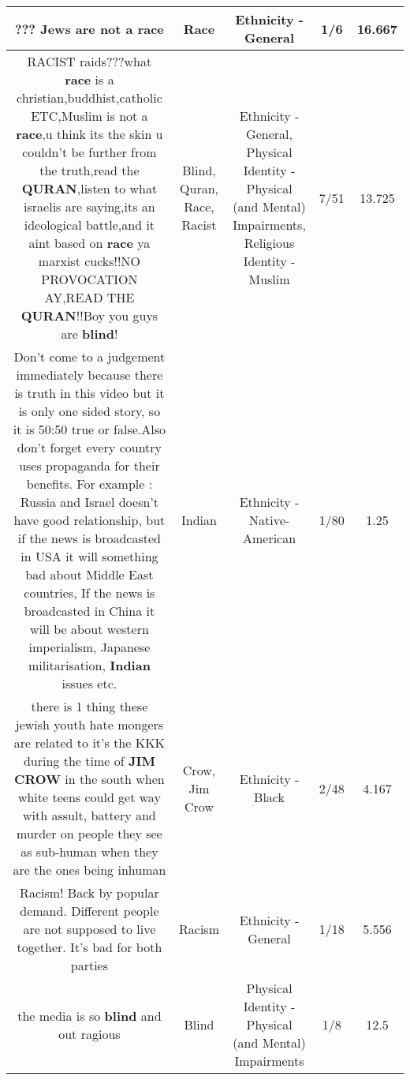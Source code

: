 \documentclass[11pt]{article}
\newlength\mylength
\begin{document}
\begin{center}
\begin{longtable}{|C{.65\mylength}|C{.30\mylength}|C{.12\mylength}|C{.12\mylength}|C{.12\mylength}|}
  \small ??? Jews are not a race\normalsize   & Race & Ethnicity - General & 1/6 & 16.667 \\  \hline
  \small RACIST raids???what \textbf{race} is a christian,buddhist,catholic ETC,Muslim is not a \textbf{race},u think its the skin u couldn't be further from the truth,read the \textbf{QURAN},listen to what israelis are saying,its an ideological battle,and it aint based on \textbf{race} ya marxist cucks!!NO PROVOCATION AY,READ THE \textbf{QURAN}!!Boy you guys are \textbf{blind}!\normalsize   & Blind, Quran, Race, Racist & Ethnicity - General, Physical Identity - Physical (and Mental) Impairments, Religious Identity - Muslim & 7/51 & 13.725 \\  \hline
  \small Don't come to a judgement immediately because there is truth in this video but it is only one sided story, so it is 50:50  true or false.Also don't forget every country uses propaganda for their benefits. For example : Russia and Israel doesn't have good relationship, but if the news is broadcasted in USA it will something bad about Middle East countries, If the news is broadcasted in China it will be about western imperialism, Japanese militarisation, \textbf{Indian} issues etc.\normalsize   & Indian & Ethnicity - Native-American & 1/80 & 1.25 \\  \hline
  \small there is 1 thing these jewish youth hate mongers are related to it's the KKK during the time of \textbf{JIM C\textbf{ROW}}  in the south when white  teens could get way with assult, battery and murder on people they see as sub-human when they are the ones being inhuman\normalsize   & Crow, Jim Crow & Ethnicity - Black & 2/48 & 4.167 \\  \hline
  \small Racism! Back by popular demand. Different people are not supposed to live together. It's bad for both parties\normalsize   & Racism & Ethnicity - General & 1/18 & 5.556 \\  \hline
  \small the media is so \textbf{blind} and out ragious\normalsize   & Blind & Physical Identity - Physical (and Mental) Impairments & 1/8 & 12.5 \\  \hline

\end{longtable}
\end{center}
\end{document}
